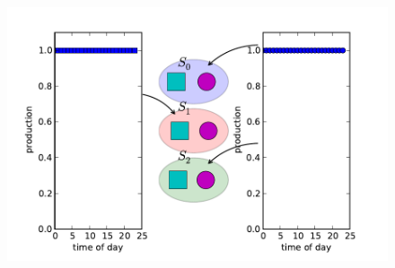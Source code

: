 \documentclass[xcolor=dvipsnames]{beamer}
\begin{document}
\begin{frame}
\begin{columns}
\begin{column}{.5 \linewidth}
\begin{figure}
				\includegraphics[scale=.35]{rond_carre_3.pdf}
			\end{figure}
		\end{column}
	\end{columns}		
	
\end{frame}

%
%
\end{document}
